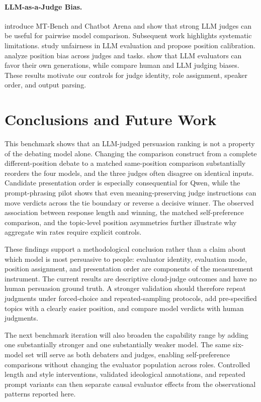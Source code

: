 \documentclass{article}
\begin{document}
\paragraph{LLM-as-a-Judge Bias.}
\citet{zheng2023judge} introduce MT-Bench and Chatbot Arena and show that strong LLM judges can be useful for pairwise model comparison. Subsequent work highlights systematic limitations. \citet{wang2024faireval} study unfairness in LLM evaluation and propose position calibration. \citet{shi2024positionbias} analyze position bias across judges and tasks. \citet{panickssery2024selfpreference} show that LLM evaluators can favor their own generations, while \citet{chen2024judgementbias} compare human and LLM judging biases. These results motivate our controls for judge identity, role assignment, speaker order, and output parsing.

\section{Conclusions and Future Work}
This benchmark shows that an LLM-judged persuasion ranking is not a property of the debating model alone. Changing the comparison construct from a complete different-position debate to a matched same-position comparison substantially reorders the four models, and the three judges often disagree on identical inputs. Candidate presentation order is especially consequential for Qwen, while the prompt-phrasing pilot shows that even meaning-preserving judge instructions can move verdicts across the tie boundary or reverse a decisive winner. The observed association between response length and winning, the matched self-preference comparison, and the topic-level position asymmetries further illustrate why aggregate win rates require explicit controls.

These findings support a methodological conclusion rather than a claim about which model is most persuasive to people: evaluator identity, evaluation mode, position assignment, and presentation order are components of the measurement instrument. The current results are descriptive cloud-judge outcomes and have no human persuasion ground truth. A stronger validation should therefore repeat judgments under forced-choice and repeated-sampling protocols, add pre-specified topics with a clearly easier position, and compare model verdicts with human judgments.

The next benchmark iteration will also broaden the capability range by adding one substantially stronger and one substantially weaker model. The same six-model set will serve as both debaters and judges, enabling self-preference comparisons without changing the evaluator population across roles. Controlled length and style interventions, validated ideological annotations, and repeated prompt variants can then separate causal evaluator effects from the observational patterns reported here.







\end{document}
